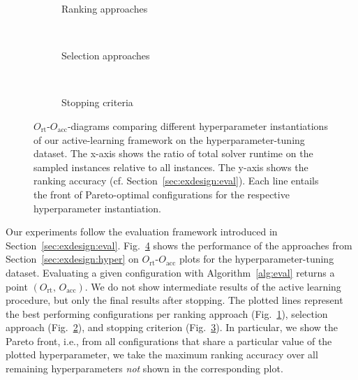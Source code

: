 \documentclass[sn-basic, Numbered]{sn-jnl} %
\begin{document}
\begin{figure}[tbp!]
  \centering
  \begin{subfigure}{1.0\textwidth}
    \caption{Ranking approaches}
    \label{fig:annitraincolorranking}
  \end{subfigure}
  \\
  \vspace{0.2cm}
  \begin{subfigure}{1.0\textwidth}
    \caption{Selection approaches}
    \label{fig:annitraincolorselection}
  \end{subfigure}
  \\
  \vspace{0.2cm}
  \begin{subfigure}{1.0\textwidth}
    \caption{Stopping criteria}
    \label{fig:annitraincolorstopping}
  \end{subfigure}
  \caption{
    $O_{\operatorname{rt}}$-$O_{\operatorname{acc}}$-diagrams comparing different hyperparameter instantiations of our active-learning framework on the hyperparameter-tuning dataset.
    The x-axis shows the ratio of total solver runtime on the sampled instances relative to all instances.
    The y-axis shows the ranking accuracy (cf. Section~\ref{sec:exdesign:eval}).
    Each line entails the front of Pareto-optimal configurations for the respective hyperparameter instantiation.
  }
  \label{fig:e2eallsolvers}
\end{figure}

Our experiments follow the evaluation framework introduced in Section~\ref{sec:exdesign:eval}.
Fig.~\ref{fig:e2eallsolvers} shows the performance of the approaches from Section~\ref{sec:exdesign:hyper} on $O_{\operatorname{rt}}$-$O_{\operatorname{acc}}$ plots for the hyperparameter-tuning dataset.
Evaluating a given configuration with Algorithm~\ref{alg:eval} returns a point $\left(O_{\operatorname{rt}},\, O_{\operatorname{acc}}\right)$.
We do not show intermediate results of the active learning procedure, but only the final results after stopping.
The plotted lines represent the best performing configurations per ranking approach (Fig.~\ref{fig:annitraincolorranking}), selection approach (Fig.~\ref{fig:annitraincolorselection}), and stopping criterion (Fig.~\ref{fig:annitraincolorstopping}).
In particular, we show the Pareto front, i.e., from all configurations that share a particular value of the plotted hyperparameter, we take the maximum ranking accuracy over all remaining hyperparameters \emph{not} shown in the corresponding plot.
\end{document}
